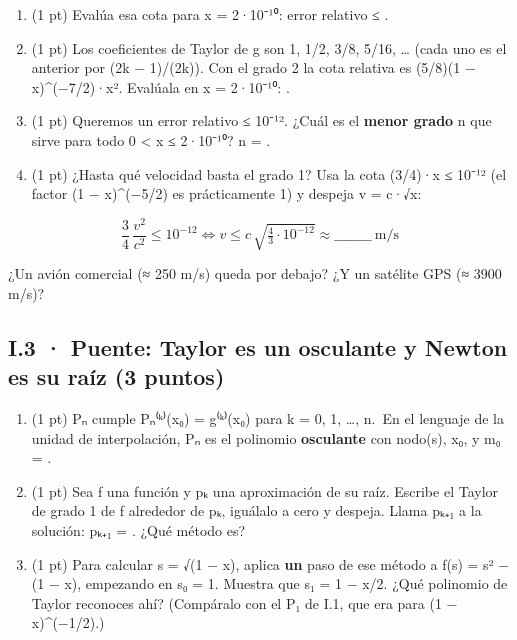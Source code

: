 \begin{enumerate}
\def\labelenumi{\alph{enumi})}
\item
  (1 pt) Evalúa esa cota para x = 2·10⁻¹⁰: error relativo ≤  .
\item
  (1 pt) Los coeficientes de Taylor de g son 1, 1/2, 3/8, 5/16, \ldots{} (cada uno es el anterior por (2k − 1)/(2k)). Con el grado 2 la cota relativa es (5/8)(1 − x)\^{}(−7/2)·x². Evalúala en x = 2·10⁻¹⁰:  .
\item
  (1 pt) Queremos un error relativo ≤ 10⁻¹². ¿Cuál es el \textbf{menor grado} n que sirve para todo 0 \textless{} x ≤ 2·10⁻¹⁰? n =  .
\item
  (1 pt) ¿Hasta qué velocidad basta el grado 1? Usa la cota (3/4)·x ≤ 10⁻¹² (el factor (1 − x)\^{}(−5/2) es prácticamente 1) y despeja v = c·√x:
\end{enumerate}

\[\frac{3}{4}\,\frac{v^2}{c^2} \le 10^{-12} \iff v \le c\,\sqrt{\tfrac{4}{3}\cdot 10^{-12}} \approx \_\_\_\_\_\_\_\_\ \text{m/s}\]

¿Un avión comercial (≈ 250 m/s) queda por debajo? ¿Y un satélite GPS (≈ 3900 m/s)?


\subsection{I.3 · Puente: Taylor es un osculante y Newton es su raíz (3 puntos)}

\begin{enumerate}
\def\labelenumi{\alph{enumi})}
\item
  (1 pt) Pₙ cumple Pₙ⁽ᵏ⁾(x₀) = g⁽ᵏ⁾(x₀) para k = 0, 1, \ldots, n.~En el lenguaje de la unidad de interpolación, Pₙ es el polinomio \textbf{osculante} con  nodo(s), x₀, y m₀ =  .
\item
  (1 pt) Sea f una función y pₖ una aproximación de su raíz. Escribe el Taylor de grado 1 de f alrededor de pₖ, iguálalo a cero y despeja. Llama pₖ₊₁ a la solución: pₖ₊₁ =  . ¿Qué método es?
\item
  (1 pt) Para calcular s = √(1 − x), aplica \textbf{un} paso de ese método a f(s) = s² − (1 − x), empezando en s₀ = 1. Muestra que s₁ = 1 − x/2. ¿Qué polinomio de Taylor reconoces ahí? (Compáralo con el P₁ de I.1, que era para (1 − x)\^{}(−1/2).)
\end{enumerate}


